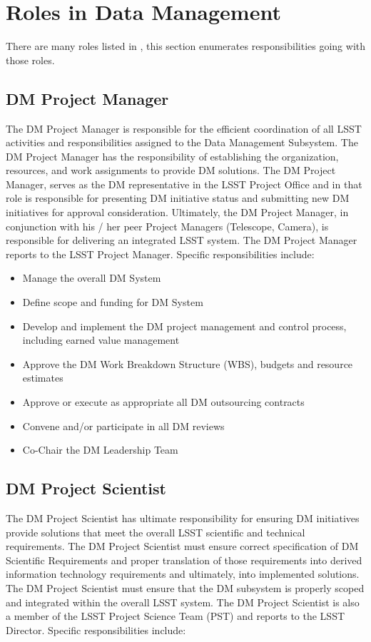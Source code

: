 \section{Roles in Data Management}

There are many roles listed in , this section enumerates responsibilities going with those roles. 


\subsection{DM Project Manager \label{role:dmpm}}

The DM Project Manager is responsible for the efficient coordination of all LSST activities and responsibilities assigned to the Data Management Subsystem. The DM Project Manager has the responsibility of establishing the organization, resources, and work assignments to provide DM solutions.  The DM Project Manager, serves as the DM representative in the LSST Project Office and in that role is responsible for presenting DM initiative status and submitting new DM initiatives for approval consideration. Ultimately, the DM Project Manager, in conjunction with his / her peer Project Managers (Telescope, Camera), is responsible for delivering an integrated LSST system. The DM Project Manager reports to the LSST Project Manager. Specific responsibilities include:

\begin{itemize}
\item Manage the overall DM System
\item Define scope and funding for DM System 
\item Develop and implement the DM project management and control process, including earned value management
\item Approve the DM Work Breakdown Structure (WBS), budgets and resource estimates
\item Approve or execute as appropriate all DM outsourcing contracts 
\item Convene and/or participate in all DM reviews
\item Co-Chair the DM Leadership Team
\end{itemize}

\subsection{DM Project Scientist \label{role:dmps} }
The DM Project Scientist has ultimate responsibility for ensuring DM initiatives provide solutions that meet the overall LSST scientific and technical requirements.  The DM Project Scientist must ensure correct specification of DM Scientific Requirements and proper translation of those requirements into derived information technology requirements and ultimately, into implemented solutions.  The DM Project Scientist must ensure that the DM subsystem is properly scoped and integrated within the overall LSST system.  The DM Project Scientist is also a member of the LSST Project Science Team (PST) and reports to the LSST Director. Specific responsibilities include:


